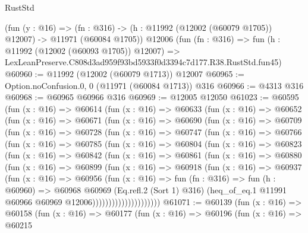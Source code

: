 \begin{lexlean}{RustStd}
\begin{coremodule}
    (fun (y : @16) =>
    (fn : @316) -> (h : @11992 (@12002 (@60079 @1705)) @12007) -> @11971 (@60084 @1705))
    @12006
    (fun (fn : @316) =>
    fun (h : @11992 (@12002 (@60093 @1705)) @12007) =>
    LexLeanPreserve.C808d3ad959f93bd5933f0d3394c7d177.R38.RustStd.fun45)
@60960 := @11992 (@12002 (@60079 @1713)) @12007
@60965 := Option.noConfusion.{0, 0} (@11971 (@60084 @1713)) @316
@60966 := @4313 @316
@60968 := @60965 @60966 @316
@60969 := @12005 @12050
@61023 := @60595
    (fun (x : @16) =>
    @60614
      (fun (x : @16) =>
      @60633
        (fun (x : @16) =>
        @60652
          (fun (x : @16) =>
          @60671
            (fun (x : @16) =>
            @60690
              (fun (x : @16) =>
              @60709
                (fun (x : @16) =>
                @60728
                  (fun (x : @16) =>
                  @60747
                    (fun (x : @16) =>
                    @60766
                      (fun (x : @16) =>
                      @60785
                        (fun (x : @16) =>
                        @60804
                          (fun (x : @16) =>
                          @60823
                            (fun (x : @16) =>
                            @60842
                              (fun (x : @16) =>
                              @60861
                                (fun (x : @16) =>
                                @60880
                                  (fun (x : @16) =>
                                  @60899
                                    (fun (x : @16) =>
                                    @60918
                                      (fun (x : @16) =>
                                      @60937
                                        (fun (x : @16) =>
                                        @60956
                                          (fun (x : @16) =>
                                          fun (fn : @316) =>
                                          fun (h : @60960) =>
                                          @60968
                                            @60969
                                            (Eq.refl.{2} (Sort 1) @316)
                                            (heq_of_eq.{1}
                                              @11991
                                              @60966
                                              @60969
                                              @12006)))))))))))))))))))))
@61071 := @60139
    (fun (x : @16) =>
    @60158
      (fun (x : @16) =>
      @60177
        (fun (x : @16) =>
        @60196
          (fun (x : @16) =>
          @60215

\end{coremodule}
\end{lexlean}
